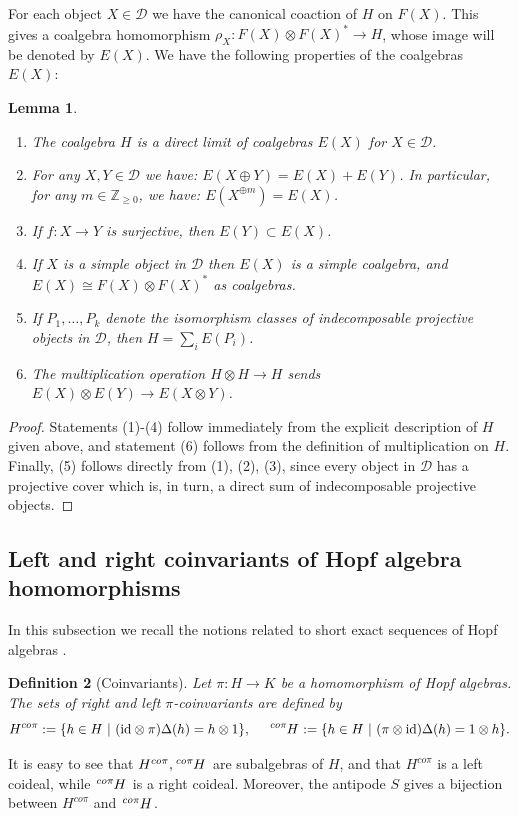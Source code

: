 \documentclass{amsart}
\theoremstyle{plain}%
\newtheorem{lemma}{Lemma}[subsection]
\newtheorem{definition}[lemma]{Definition}
\theoremstyle{remark}
\newcommand{\1}{\mathbbm{1}}
\newcommand{\D}{\mathcal{D}}
\newcommand{\Z}{\mathbb{Z}}
\newcommand{\id}{\mathrm{id}}
\newcommand{\prescr}[2]{\tensor*[^{#1}]{#2}{}}
\begin{document}
        For each object $X\in \D$ we have the canonical coaction of $H$ on $F(X)$. This gives a coalgebra homomorphism
        $\rho_X:F(X)\otimes F(X)^* \to H$, whose image will be denoted by $E(X)$. We have the following properties of the coalgebras $E(X)$:
        \begin{lemma}\label{lem:E_X}
            \mbox{}
            \begin{enumerate}           
                \item The coalgebra $H$ is a direct limit of coalgebras $ E(X)$ for $X\in \D$. 
                \item For any $X, Y\in \D$ we have: $E(X\oplus Y)=E(X)+E(Y)$. In particular, for any $m\in \Z_{\geq 0}$, we have: $E(X^{\oplus m})=E(X)$.
                \item If $f:X\to Y$ is surjective, then $E(Y)\subset E(X)$.
                \item If $X$ is a simple object in $\D$ then $E(X)$ is a simple coalgebra, and $E(X)\cong F(X)\otimes F(X)^*$ as coalgebras.
                \item If $P_1, \ldots, P_k$ denote the isomorphism classes of indecomposable projective objects in $\D$, then $H=\sum_i E(P_i)$.           
                \item The multiplication operation $H\otimes H\to H$ sends $E(X)\otimes E(Y)\to E(X\otimes Y)$.
            \end{enumerate}
        \end{lemma}
        \begin{proof}
            Statements (1)-(4) follow immediately from the explicit description of $H$ given above, and statement (6) follows from the definition of multiplication on $H$. Finally, (5) follows directly from (1), (2), (3), since every object in $\D$ has a projective cover which is, in turn, a direct sum of indecomposable projective objects.
        \end{proof}

  
    \subsection{Left and right coinvariants of Hopf algebra homomorphisms}\label{sec: left and right coinvariances}
        In this subsection we recall the notions related to short exact sequences of Hopf algebras \cite[\S1.7]{M}.
\begin{definition}[Coinvariants]
    Let $\pi:H\to K$ be a homomorphism of Hopf algebras. The sets of {\it right and left $\pi$-coinvariants} are defined by $$H^{co \pi}:=\{h\in H~\rvert~ (\id\otimes \pi)\Delta(h) = h\otimes 1\}, \;\;\;\;\;\prescr{co\pi}{H} := \{h\in H~\rvert ~(\pi\otimes \id)\Delta(h) = 1\otimes h\}.$$ 
\end{definition}
It is easy to see that $H^{co \pi}, \prescr{co\pi}{H}$ are subalgebras of $H$, and that $H^{co \pi}$ is a left coideal, while $\prescr{co\pi}{H}$ is a right coideal. Moreover, the antipode $S$ gives a bijection between $H^{co \pi}$ and $ \prescr{co\pi}{H}$. 
\end{document}
